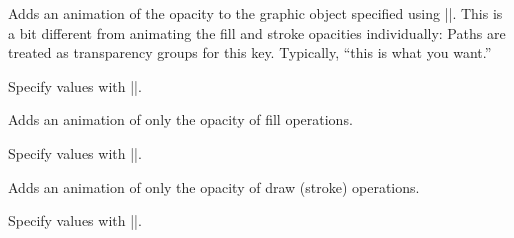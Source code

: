 \begin{command}{\pgfsys@animateopacity}
  Adds an animation of the opacity to the graphic object specified
  using |\pgfsys@animation@whom|. This is a bit different from animating
  the fill and stroke opacities  individually: Paths are treated as
  transparency groups for this key. Typically, ``this is what you
  want.''
  
  Specify values with |\pgfsys@animation@scalar|.

\begin{codeexample}[width=2cm]
\end{codeexample}
\end{command}

\begin{command}{\pgfsys@animatefillopacity}
  Adds an animation of only the opacity of fill operations.
  
  Specify values with |\pgfsys@animation@scalar|.

\begin{codeexample}[width=2cm]
\end{codeexample}
\end{command}

\begin{command}{\pgfsys@animatestrokeopacity}
  Adds an animation of only the opacity of draw (stroke) operations.
  
  Specify values with |\pgfsys@animation@scalar|.
  
\begin{codeexample}[width=2cm]
\end{codeexample}
\end{command}

